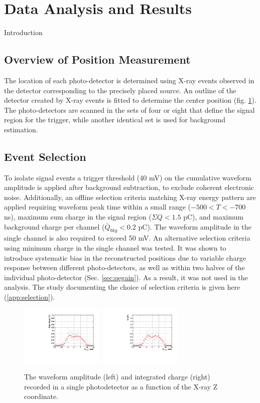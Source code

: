 \section{Data Analysis and Results}\label{sec:analysis}

Introduction

\subsection{Overview of Position Measurement}

The location of each photo-detector is determined using X-ray events observed in
the detector corresponding to the precisely placed source.  An outline of the
detector  created by X-ray events is fitted to determine the center position
(fig. \ref{fig:xrayevents}).  The photo-detectors are scanned in the sets of four
or eight that define the signal region for the trigger, while another identical
set is used for background estimation.  


\subsection{Event Selection}
To isolate signal events a trigger
threshold (40 mV) on the cumulative waveform amplitude is applied after
background subtraction, to exclude coherent electronic noise.  Additionally, an
offline selection criteria matching X-ray energy pattern are applied requiring
waveform peak time within a small range ($-500<T<-700$ ns), maximum sum charge
in the signal region ($\Sigma Q<1.5$ pC), and maximum background charge per
channel ($\bar{Q}_{bkg}<$0.2 pC).  The waveform amplitude in the single channel
is also required to exceed 50 mV.  An alternative selection criteria using
minimum charge  in the single channel was tested. It was shown to introduce
systematic bias in the reconstructed positions due to variable charge response
between different photo-detectors, as well as within two halves of the
individual photo-detector (Sec. \ref{sec:qegain}).  As a result, it was not used
in the analysis.  The study documenting the choice of selection criteria is
given here (\ref{app:selection}).

\begin{figure}[h]
  \centering
  \includegraphics[width=4cm]{plots/2018/HeightvsZ}
  \includegraphics[width=4cm]{plots/2018/ChargevsZ}
  \caption{The waveform amplitude (left) and integrated charge (right) recorded in a single 
    photodetector as a function of the X-ray Z coordinate.
    }
  \label{fig:xrayevents}
\end{figure}  


